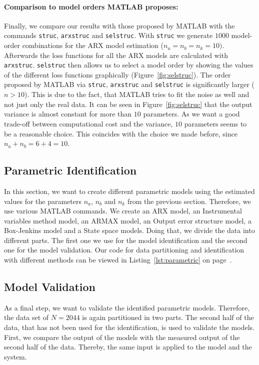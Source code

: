 \paragraph{Comparison to model orders MATLAB proposes:} Finally, we compare our results with those proposed by MATLAB with the commands \texttt{struc}, \texttt{arxstruc} and \texttt{selstruc}. 
With \texttt{struc} we generate $1000$ model-order combinations for the ARX model estimation ($n_a = n_b = n_k = 10)$. Afterwards the loss functions for all the ARX models are calculated with \texttt{arxstruc}. \texttt{selstruc} then allows us to select a model order by showing the values of the different loss functions graphically (Figure~\ref{fig:selstruc}). 
The order proposed by MATLAB via \texttt{struc}, \texttt{arxstruc} and \texttt{selstruc} is significantly larger ($n > 10$). 
This is due to the fact, that MATLAB tries to fit the noise as well and not just only the real data. 
It can be seen in Figure~\ref{fig:selstruc} that the output variance is almost constant for more than $10$ parameters.
As we want a good trade-off between computational cost and the variance, $10$ parameters seems to be a reasonable choice.
This coincides with the choice we made before, since $n_a + n_b = 6 + 4 = 10$. 

\subsection{Parametric Identification}
In this section, we want to create different parametric models using the estimated values for the parameters $n_a$, $n_b$ and $n_k$ from the previous section. 
Therefore, we use various MATLAB commands. 
We create an ARX model, an Instrumental variables method model, an ARMAX model, an Output error structure model, a Box-Jenkins model and a State space models.
Doing that, we divide the data into different parts. 
The first one we use for the model identification and the second one for the model validation. 
Our code for data partitioning and identification with different methods can be viewed in Listing~\ref{lst:parametric} on page~\pageref{lst:parametric}.

\subsection{Model Validation}
As a final step, we want to validate the identified parametric models. Therefore, the data set of $N = 2044$ is again partitioned in two parts. The second half of the data, that has not been used for the identification, is used to validate the models. \\
First, we compare the output of the models with the measured output of the second half of the data.  Thereby, the same input is applied to the model and the system. 

